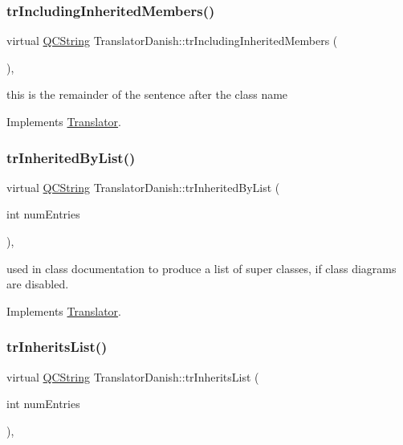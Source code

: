 \subsubsection{\texorpdfstring{trIncludingInheritedMembers()}{trIncludingInheritedMembers()}}
{\footnotesize\ttfamily virtual \mbox{\hyperlink{class_q_c_string}{Q\+C\+String}} Translator\+Danish\+::tr\+Including\+Inherited\+Members (\begin{DoxyParamCaption}{ }\end{DoxyParamCaption})\hspace{0.3cm}{\ttfamily [inline]}, {\ttfamily [virtual]}}

this is the remainder of the sentence after the class name 

Implements \mbox{\hyperlink{class_translator}{Translator}}.

\mbox{\label{class_translator_danish_a127a260b250547992284bd0590c6188b}} 
\subsubsection{\texorpdfstring{trInheritedByList()}{trInheritedByList()}}
{\footnotesize\ttfamily virtual \mbox{\hyperlink{class_q_c_string}{Q\+C\+String}} Translator\+Danish\+::tr\+Inherited\+By\+List (\begin{DoxyParamCaption}\item[{int}]{num\+Entries }\end{DoxyParamCaption})\hspace{0.3cm}{\ttfamily [inline]}, {\ttfamily [virtual]}}

used in class documentation to produce a list of super classes, if class diagrams are disabled. 

Implements \mbox{\hyperlink{class_translator}{Translator}}.

\mbox{\label{class_translator_danish_a7a2493c9703346cdf7f4667cd0ab00ba}} 
\subsubsection{\texorpdfstring{trInheritsList()}{trInheritsList()}}
{\footnotesize\ttfamily virtual \mbox{\hyperlink{class_q_c_string}{Q\+C\+String}} Translator\+Danish\+::tr\+Inherits\+List (\begin{DoxyParamCaption}\item[{int}]{num\+Entries }\end{DoxyParamCaption})\hspace{0.3cm}{\ttfamily [inline]}, {\ttfamily [virtual]}}


